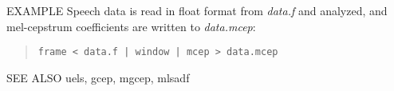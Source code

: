 \begin{qsection}{EXAMPLE}
Speech data is read in float format from {\em data.f} and 
analyzed, and mel-cepstrum coefficients are written to {\em data.mcep}:
\begin{quote}
 \verb!frame < data.f | window | mcep > data.mcep !
\end{quote}
\end{qsection}

\begin{qsection}{SEE ALSO}
 uels, gcep, mgcep, mlsadf
\end{qsection}
